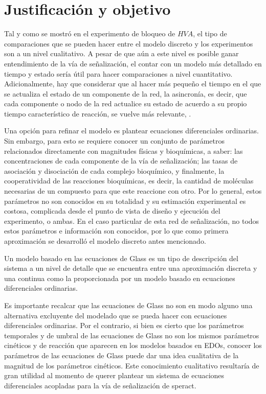 \section{Justificación y objetivo}

Tal y como se mostró en el experimento de bloqueo de $HVA$, el tipo de comparaciones que se pueden hacer entre el modelo discreto y los experimentos son a un nivel cualitativo. A pesar de que aún a este nivel es posible ganar entendimiento de la vía de señalización, el contar con un modelo más detallado en tiempo y estado sería útil para hacer comparaciones a nivel cuantitativo.
Adicionalmente, hay que considerar que al hacer más pequeño el tiempo en el que se actualiza el estado de un componente de la red, la asincronía, es decir, que cada componente o nodo de la red actualice su estado de acuerdo a su propio tiempo característico de reacción, se vuelve más relevante, \citeauthor{Reka3Nodos2010} \citep{Reka3Nodos2010}.

Una opción para refinar el modelo es plantear ecuaciones diferenciales ordinarias. Sin embargo, para esto se requiere conocer un conjunto de parámetros relacionados directamente con magnitudes físicas y bioquímicas, a saber: las concentraciones de cada componente de la vía de señalización; las tasas de asociación y disociación de cada complejo bioquímico, y finalmente, la cooperatividad de las reacciones bioquímicas, es decir, la cantidad de moléculas necesarias de un compuesto para que este reaccione con otro. Por lo general, estos parámetros no son conocidos en su totalidad y su estimación experimental es costosa, complicada desde el punto de vista de diseño y ejecución del experimento, o ambas. En el caso particular de esta red de señalización, no todos estos parámetros e información son conocidos, por lo que como primera aproximación se desarrolló el modelo discreto antes mencionado.

Un modelo basado en las ecuaciones de Glass es un tipo de descripción del sistema a un nivel de detalle que se encuentra entre una aproximación discreta y una continua como la proporcionada por un modelo basado en ecuaciones diferenciales ordinarias.

Es importante recalcar que las ecuaciones de Glass no son en modo alguno una alternativa excluyente del modelado que se pueda hacer con ecuaciones diferenciales ordinarias. Por el contrario, si bien es cierto que los parámetros temporales y de umbral de las ecuaciones de Glass no son los mismos parámetros cinéticos y de reacción que aparecen en los modelos basados en EDOs, conocer los parámetros de las ecuaciones de Glass puede dar una idea cualitativa de la magnitud de los parámetros cinéticos. Este conocimiento cualitativo resultaría de gran utilidad al momento de querer plantear un sistema de ecuaciones diferenciales acopladas para la vía de señalización de speract.


